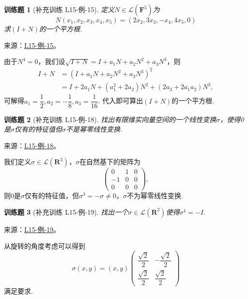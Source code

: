 \documentclass[UTF8,12pt,a4paper,fontset=fandol]{ctexart}
\newtheorem{exercise}{训练题}[section]
\begin{document}
\begin{exercise}[补充训练 L15-例-15]\label{prob:L15-例-15}
定义$N\in \mathcal{L}(\mathbf{F}^5)$为
    \[N(x_1,x_2,x_3,x_4,x_5)=(2x_2,3x_3,-x_4,4x_5,0)\]
    求$(I+N)$的一个平方根.
\end{exercise}
\noindent 来源：\href{https://github.com/yhwu-is/Linear-Algebra-Left-Undone/blob/new/%E8%AE%B2%E4%B9%89/%E4%B8%93%E9%A2%98/15%20%E7%9B%B8%E4%BC%BC%E6%A0%87%E5%87%86%E5%BD%A2%EF%BC%9A%E5%A4%8D%E6%95%B0%E5%9F%9F%E4%B8%8A%E7%9A%84%E5%B0%9D%E8%AF%95%E4%B8%8E%E7%90%86%E8%AE%BA.tex}{L15-例-15}。
\begin{solve}
由于$N^4=0$，我们设$\sqrt{I+N}=I+a_1N+a_2N^2+a_3N^3$，则
    \begin{align*}
        I+N&=(I+a_1N+a_2N^2+a_3N^3)^2 \\
        &=I+2a_1N+(a_1^2+2a_2)N^2+(2a_3+2a_1a_2)N^3,
    \end{align*}
    可解得$a_1=\dfrac{1}{2},a_2=-\dfrac{1}{8},a_3=\dfrac{1}{16}$. 代入即可算出$(I+N)$的一个平方根.
\end{solve}

\begin{exercise}[补充训练 L15-例-18]\label{prob:L15-例-18}
找出有限维实向量空间的一个线性变换$\sigma$，使得0是$\sigma$仅有的特征值但$\sigma$不是幂零线性变换.
\end{exercise}
\noindent 来源：\href{https://github.com/yhwu-is/Linear-Algebra-Left-Undone/blob/new/%E8%AE%B2%E4%B9%89/%E4%B8%93%E9%A2%98/15%20%E7%9B%B8%E4%BC%BC%E6%A0%87%E5%87%86%E5%BD%A2%EF%BC%9A%E5%A4%8D%E6%95%B0%E5%9F%9F%E4%B8%8A%E7%9A%84%E5%B0%9D%E8%AF%95%E4%B8%8E%E7%90%86%E8%AE%BA.tex}{L15-例-18}。
\begin{solve}
我们定义$\sigma\in\mathcal{L}({\mathbf{R}^3})$，$\sigma$在自然基下的矩阵为
            \[\begin{pmatrix}
                0 & 1 & 0 \\
                -1 & 0 & 0 \\
                0 & 0 & 0
            \end{pmatrix},\]
            则$0$是$\sigma$仅有的特征值，但$\sigma^3=-\sigma\neq 0$，$\sigma$不为幂零线性变换.
\end{solve}

\begin{exercise}[补充训练 L15-例-19]\label{prob:L15-例-19}
找出一个$\sigma\in \mathcal{L}(\mathbf{R}^2)$使得$\sigma^4=-I$.
\end{exercise}
\noindent 来源：\href{https://github.com/yhwu-is/Linear-Algebra-Left-Undone/blob/new/%E8%AE%B2%E4%B9%89/%E4%B8%93%E9%A2%98/15%20%E7%9B%B8%E4%BC%BC%E6%A0%87%E5%87%86%E5%BD%A2%EF%BC%9A%E5%A4%8D%E6%95%B0%E5%9F%9F%E4%B8%8A%E7%9A%84%E5%B0%9D%E8%AF%95%E4%B8%8E%E7%90%86%E8%AE%BA.tex}{L15-例-19}。
\begin{solve}
从旋转的角度考虑可以得到
            \[
            \sigma(x,y)=(x,y)\begin{pmatrix}
                \dfrac{\sqrt{2}}{2} & -\dfrac{\sqrt{2}}{2} \\[1ex]
                \dfrac{\sqrt{2}}{2} & \dfrac{\sqrt{2}}{2}
            \end{pmatrix}
            \]
            满足要求.
\end{solve}
\end{document}
